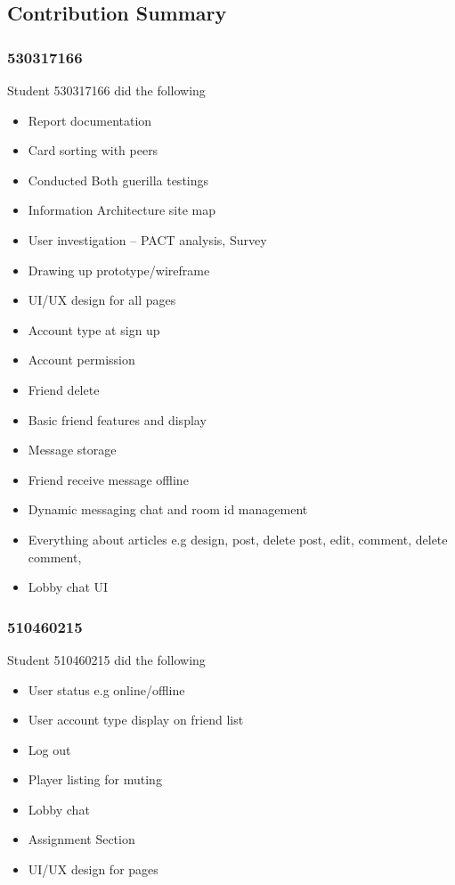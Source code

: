 \documentclass[12pt,a4paper]{article}
\begin{document}
\subsection*{Contribution Summary}
\subsubsection*{530317166}
Student 530317166 did the following
\begin{itemize}
    \item Report documentation
    \item Card sorting with peers
    \item Conducted Both guerilla testings
    \item Information Architecture site map
    \item User investigation – PACT analysis, Survey
    \item Drawing up prototype/wireframe
    \item UI/UX design for all pages
    \item Account type at sign up
    \item Account permission 
    \item Friend delete
    \item Basic friend features and display
    \item Message storage 
    \item Friend receive message offline
    \item Dynamic messaging chat and room id management
    \item Everything about articles e.g design, post, delete post, edit, comment, delete comment, 
    \item Lobby chat UI
\end{itemize}

\subsubsection*{510460215}
Student 510460215 did the following
\begin{itemize}
    \item User status e.g online/offline
    \item User account type display on friend list
    \item Log out
    \item Player listing for muting 
    \item Lobby chat 
    \item Assignment Section
    \item UI/UX design for pages
\end{itemize}
\end{document}
